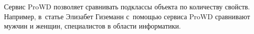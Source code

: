 Сервис ProWD позволяет сравнивать подклассы объекта по количеству свойств. 
Например, в~статье Элизабет Гиземанн\autocite{Giesemann2020} 
с~помощью сервиса ProWD сравнивают мужчин и женщин, специалистов в области информатики.




